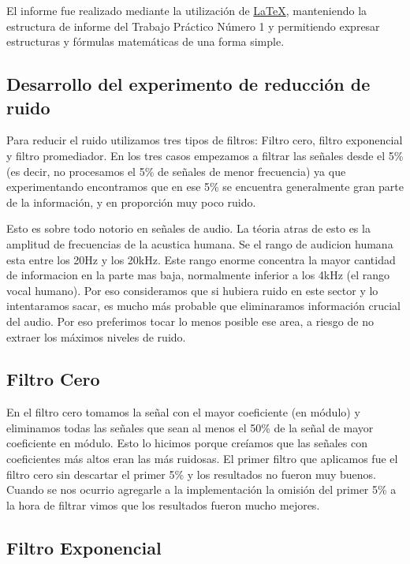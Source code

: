 El informe fue realizado mediante la utilizaci\'on de \href{http://www.latex-project.org/}{LaTeX},
 manteniendo la estructura de informe del Trabajo Pr\'actico N\'umero 1 y
permitiendo expresar estructuras y f\'ormulas matem\'aticas de una forma simple.

\subsection{Desarrollo del experimento de reducci\'on de ruido}

Para reducir el ruido utilizamos tres tipos de filtros: Filtro cero, filtro 
exponencial y filtro promediador. En los tres casos empezamos a filtrar las 
se\~nales desde el 5\% (es decir, no procesamos el 5\% de se\~nales de menor
frecuencia) ya que experimentando encontramos que en ese 5\% se encuentra 
generalmente gran parte de la informaci\'on, y en proporci\'on muy poco ruido.

Esto es sobre todo notorio en se\~nales de audio. La t\'eoria atras de esto es la amplitud
de frecuencias de la acustica humana. Se el rango de audicion humana esta entre los 20Hz
y los 20kHz. Este rango enorme concentra la mayor cantidad de informacion en la parte mas baja,
normalmente inferior a los 4kHz (el rango vocal humano). Por eso consideramos que
si hubiera ruido en este sector y lo intentaramos sacar, es mucho m\'as probable que eliminaramos
informaci\'on crucial del audio. Por eso preferimos tocar lo menos posible ese area,
a riesgo de no extraer los m\'aximos niveles de ruido.

\subsection{Filtro Cero}

En el filtro cero tomamos la se\~nal con el mayor coeficiente (en m\'odulo) y 
eliminamos todas las se\~nales que sean al menos el 50\% de la se\~nal de mayor 
coeficiente en m\'odulo. Esto lo hicimos porque cre\'iamos que las se\~nales con 
coeficientes m\'as altos eran las m\'as ruidosas. El primer filtro que aplicamos 
fue el filtro cero sin descartar el primer 5\% y los resultados no fueron muy 
buenos. Cuando se nos ocurrio agregarle a la implementaci\'on la omisi\'on del 
primer 5\% a la hora de filtrar vimos que los resultados fueron mucho mejores.

\subsection{Filtro Exponencial}



